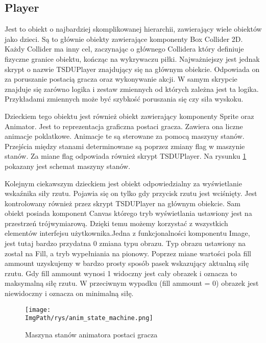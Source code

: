 \documentclass[a4paper,12pt,twoside,openany]{report}
\newcommand{\ImgPath}{.}
\begin{document}
\subsection{Player}
\label{player}
Jest to obiekt o najbardziej skomplikowanej hierarchii, zawierający wiele obiektów jako dzieci. Są to głównie obiekty zawierające komponenty Box Collider 2D. Każdy Collider ma inny cel, zaczynając o głównego Collidera który definiuje fizyczne granice obiektu, kończąc na wykrywaczu piłki. Najważniejszy jest jednak skrypt o nazwie TSDUPlayer znajdujący się na głównym obiekcie. Odpowiada on za poruszanie postacią gracza oraz wykonywanie akcji. W samym skrypcie znajduje się zarówno logika i zestaw zmiennych od których zależna jest ta logika. Przykładami zmiennych może być szybkość poruszania się czy siła wyskoku.

Dzieckiem tego obiektu jest również obiekt zawierający komponenty Sprite oraz Animator. Jest to reprezentacja graficzna postaci gracza. Zawiera ona liczne animacje poklatkowe. Animacje te są sterowane za pomocą maszyny stanów. Przejścia między stanami determinowane są poprzez zmiany flag w maszynie stanów. Za miane flag odpowiada również skrypt TSDUPlayer. Na rysunku \ref{anim_state_machine} pokazany jest schemat maszyny stanów. 

Kolejnym ciekawszym dzieckiem jest obiekt odpowiedzialny za wyświetlanie wskaźnika siły rzutu. Pojawia się on tylko gdy przycisk rzutu jest wciśnięty. Jest kontrolowany również przez skrypt TSDUPlayer na głównym obiekcie. Sam obiekt posiada komponent Canvas którego tryb wyświetlania ustawiony jest na przestrzeń trójwymiarową. Dzięki temu możemy korzystać z wszystkich elementów interfejsu użytkownika.Jedna z funkcjonalności komponentu Image, jest tutaj bardzo przydatna 0 zmiana typu obrazu. Typ obrazu ustawiony na został na Fill, a tryb wypełniania na pionowy. Poprzez miane wartości pola fill ammount uzyskujemy w bardzo prosty sposób pasek wskazujący aktualną siłę rzutu. Gdy fill ammount wynosi 1 widoczny jest cały obrazek i oznacza to maksymalną siłę rzutu. W przeciwnym wypadku (fill ammount = 0) obrazek jest niewidoczny i oznacza on minimalną siłę.  

\begin{figure}[H]
	\begin{center}
\centering
\texttt{[image: \\ImgPath/rys/anim\_state\_machine.png]}
\end{center}
	\caption{Maszyna stanów animatora postaci gracza}
	\label{anim_state_machine}
\end{figure}
\end{document}
